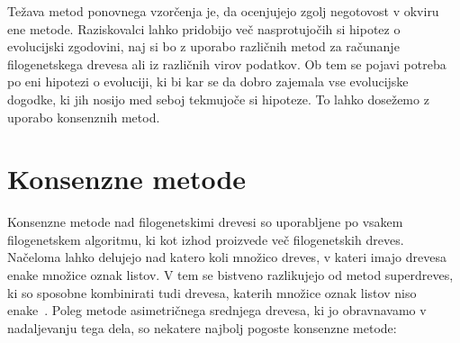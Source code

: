 \documentclass[a4paper, 12pt]{book}
\begin{document}
Težava metod ponovnega vzorčenja je, da ocenjujejo zgolj negotovost v okviru 
ene metode. Raziskovalci lahko pridobijo več nasprotujočih si hipotez o evolucijski 
zgodovini, naj si bo z uporabo različnih metod za računanje filogenetskega drevesa 
ali iz različnih virov podatkov. Ob tem se pojavi potreba po eni hipotezi o evoluciji, 
ki bi kar se da dobro zajemala vse evolucijske dogodke, ki jih nosijo med seboj 
tekmujoče si hipoteze. To lahko dosežemo z uporabo konsenznih metod.

\section{Konsenzne metode}
Konsenzne metode nad filogenetskimi drevesi so uporabljene po vsakem filogenetskem
algoritmu, ki kot izhod proizvede več filogenetskih dreves. Nače\-lo\-ma lahko delujejo 
nad katero koli množico dreves, v kateri imajo drevesa enake množice oznak listov. 
V tem se bistveno razlikujejo od metod superdreves, ki so sposobne kombinirati 
tudi drevesa, katerih množice oznak listov niso enake~\cite{bw}. Poleg metode 
asimetričnega srednjega drevesa, ki jo obravnavamo v nadaljevanju tega dela, 
so nekatere najbolj pogoste konsenzne metode:
\end{document}
